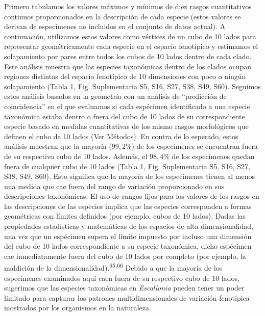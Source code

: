 \documentclass[
  11pt,
]{article}
\begin{document}
Primero tabulamos los valores máximos y mínimos de diez rasgos cuantitativos continuos proporcionados en la descripción de cada especie (estos valores se derivan de especímenes no incluidos en el conjunto de datos actual). A continuación, utilizamos estos valores como vértices de un cubo de 10 lados para representar geométricamente cada especie en el espacio fenotípico y estimamos el solapamiento por pares entre todos los cubos de 10 lados dentro de cada clado. Este análisis muestra que las especies taxonómicas dentro de los clados ocupan regiones distintas del espacio fenotípico de 10 dimensiones con poco o ningún solapamiento (Tabla 1, Fig. Suplementaria S5, S16, S27, S38, S49, S60). Seguimos estos análisis basados en la geometría con un análisis de ``predicción de coincidencia'' en el que evaluamos si cada espécimen identificado a una especie taxonómica estaba dentro o fuera del cubo de 10 lados de su correspondiente especie basado en medidas cuantitativas de los mismo rasgos morfológicos que definen el cubo de 10 lados (Ver Métodos). En contra de lo esperado, estos análisis muestran que la mayoría (\(99,2\%\)) de los especímenes se encuentran fuera de su respectivo cubo de 10 lados. Además, el \(98,4\%\) de los especímenes quedan fuera de cualquier cubo de 10 lados (Tabla 1, Fig. Suplementaria S5, S16, S27, S38, S49, S60). Esto significa que la mayoría de los especímenes tienen al menos una medida que cae fuera del rango de variación proporcionado en sus descripciones taxonómicas. El uso de rangos fijos para los valores de los rasgos en las descripciones de las especies implica que las especies corresponden a formas geométricas con límites definidos (por ejemplo, cubos de 10 lados). Dadas las propiedades estadísticas y matemáticas de los espacios de alta dimensionalidad, una vez que un espécimen supera el límite impuesto por incluso una dimensión del cubo de 10 lados correspondiente a su especie taxonómica, dicho espécimen cae inmediatamente fuera del cubo de 10 lados por completo (por ejemplo, la maldición de la dimensionalidad).\textsuperscript{65,66} Debido a que la mayoría de los especímenes examinados aquí caen fuera de su respectivo cubo de 10 lados, sugerimos que las especies taxonómicas en \emph{Escallonia} pueden tener un poder limitado para capturar los patrones multidimensionales de variación fenotípica mostrados por los organismos en la naturaleza.
\end{document}
